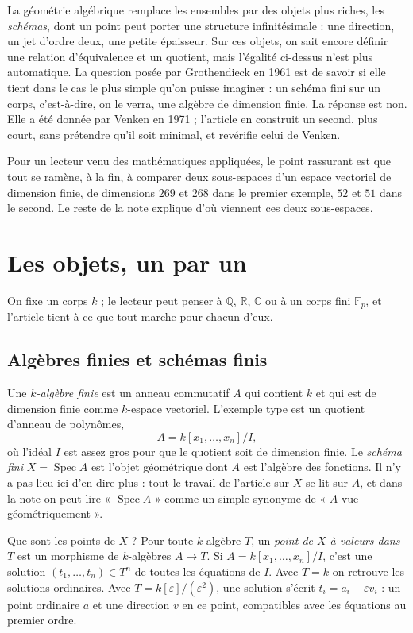 \documentclass[11pt,a4paper]{amsart}
\theoremstyle{definition}
\theoremstyle{plain}
\theoremstyle{remark}
\newcommand{\F}{\mathbb F}
\newcommand{\Q}{\mathbb Q}
\newcommand{\Spec}{\operatorname{Spec}}
\begin{document}
La géométrie algébrique remplace les ensembles par des objets plus riches, les \emph{schémas}, dont un point peut porter une structure infinitésimale : une direction, un jet d'ordre deux, une petite épaisseur. Sur ces objets, on sait encore définir une relation d'équivalence et un quotient, mais l'égalité ci-dessus n'est plus automatique. La question posée par Grothendieck en 1961 est de savoir si elle tient dans le cas le plus simple qu'on puisse imaginer : un schéma fini sur un corps, c'est-à-dire, on le verra, une algèbre de dimension finie. La réponse est non. Elle a été donnée par Venken en 1971 ; l'article en construit un second, plus court, sans prétendre qu'il soit minimal, et revérifie celui de Venken.

Pour un lecteur venu des mathématiques appliquées, le point rassurant est que tout se ramène, à la fin, à comparer deux sous-espaces d'un espace vectoriel de dimension finie, de dimensions $269$ et $268$ dans le premier exemple, $52$ et $51$ dans le second. Le reste de la note explique d'où viennent ces deux sous-espaces.

\section{Les objets, un par un}\label{sec:objets}

On fixe un corps $k$ ; le lecteur peut penser à $\Q$, $\mathbb R$, $\mathbb C$ ou à un corps fini $\F_p$, et l'article tient à ce que tout marche pour chacun d'eux.

\subsection{Algèbres finies et schémas finis}

Une \emph{$k$-algèbre finie} est un anneau commutatif $A$ qui contient $k$ et qui est de dimension finie comme $k$-espace vectoriel. L'exemple type est un quotient d'anneau de polynômes,
\[
A = k[x_1, \dots, x_n]/I,
\]
où l'idéal $I$ est assez gros pour que le quotient soit de dimension finie. Le \emph{schéma fini} $X = \Spec A$ est l'objet géométrique dont $A$ est l'algèbre des fonctions. Il n'y a pas lieu ici d'en dire plus : tout le travail de l'article sur $X$ se lit sur $A$, et dans la note on peut lire « $\Spec A$ » comme un simple synonyme de « $A$ vue géométriquement ».

Que sont les points de $X$ ? Pour toute $k$-algèbre $T$, un \emph{point de $X$ à valeurs dans $T$} est un morphisme de $k$-algèbres $A \to T$. Si $A = k[x_1, \dots, x_n]/I$, c'est une solution $(t_1, \dots, t_n) \in T^n$ de toutes les équations de $I$. Avec $T = k$ on retrouve les solutions ordinaires. Avec $T = k[\varepsilon]/(\varepsilon^2)$, une solution s'écrit $t_i = a_i + \varepsilon v_i$ : un point ordinaire $a$ et une direction $v$ en ce point, compatibles avec les équations au premier ordre.
\end{document}
